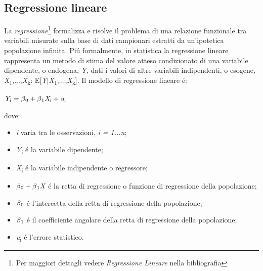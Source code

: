 \documentclass{article}
\begin{document}
\begin{appendices}
\makeatletter
{}
\makeatother
	
  	\section{Regressione lineare}\label{Regressione}
	La \textit{regressione}\footnote{Per maggiori dettagli vedere \textit{Regressione Lineare} nella bibliografia} formalizza e risolve il problema di una relazione funzionale tra variabili misurate sulla base di dati campionari estratti da un'ipotetica popolazione infinita. Pi\'u formalmente, in statistica la regressione lineare rappresenta un metodo di 		stima del valore atteso condizionato di una variabile dipendente, o endogena, \textit{Y}, dati i valori di altre variabili indipendenti, o esogene, \textit{X}\textsubscript{1},...,\textit{X}\textsubscript{k}: E[\textit{Y}\(\mid\)\textit{X}\textsubscript{1},...,\textit{X}\textsubscript{k}]. Il modello di regressione lineare \'e:

	\begin{center}
	\(\textit{Y}\textsubscript{i} = \beta\textsubscript{0} + \beta\textsubscript{1}\textit{X}\textsubscript{i} + \textit{u}\textsubscript{i}
	\)
	\end{center}

	dove:

	\begin{itemize}
	\item{\textit{i} varia tra le osservazioni, \textit{i = 1...n};}
	\item{\textit{Y}\textsubscript{i} \'e la variabile dipendente;}
	\item{\textit{X}\textsubscript{i} \'e la variabile indipendente o regressore;}
	\item{\(\beta\textsubscript{0} + \beta\textsubscript{1}\textit{X}\) \'e la retta di regressione o funzione di regressione della popolazione;}
	\item{\(\beta\textsubscript{0}\) \'e l'intercetta della retta di regressione della popolazione;}
	\item{\(\beta\textsubscript{1}\) \'e il coefficiente angolare della retta di regressione della popolazione;}
	\item{\textit{u}\textsubscript{i} \'e l'errore statistico.}
	\end{itemize}


\end{appendices}
\end{document}
